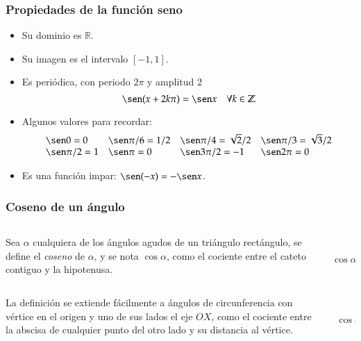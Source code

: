 \begin{frame}
\frametitle{Propiedades de la función seno}
\begin{itemize}
\item Su dominio es $\mathbb{R}$.
\item Su imagen es el intervalo $[-1,1]$.
\item Es periódica, con periodo $2\pi$ y amplitud $2$
\[\sen (x+2k\pi)= \sen x\quad \forall k\in \mathbb{Z}\]
\item Algunos valores para recordar:
\[
\begin{array}{llll}
\sen 0=0 & \sen \pi/6= 1/2 & \sen \pi/4=\sqrt{2}/2 & \sen \pi/3= \sqrt{3}/2\\
\sen \pi/2 =1 & \sen \pi = 0 & \sen 3\pi/2=-1 & \sen 2\pi=0
\end{array}
\]
\item Es una función impar: $\sen(-x)=-\sen x$.
\end{itemize}
\end{frame} 


\begin{frame}
\frametitle{Coseno de un ángulo}
\begin{definicion}
\begin{columns}
\begin{column}{0.6\textwidth}
Sea $\alpha$ cualquiera de los ángulos agudos de un triángulo rectángulo, se define el \emph{coseno} de $\alpha$, y se nota $\cos \alpha$, como el cociente entre el cateto contiguo y la hipotenusa.
\end{column}
\begin{column}{0.2\textwidth}
\begin{center}
\scalebox{1}{}\\
\scriptsize 
$\cos \alpha= \dfrac{AB}{AC}$
\end{center}
\end{column}
\end{columns}
\end{definicion}
\bigskip
\begin{columns}
\begin{column}{0.6\textwidth}
La definición se extiende fácilmente a ángulos de circunferencia con vértice en el origen y uno de sus lados el eje $OX$, como el cociente entre la abscisa de cualquier punto del otro lado y su distancia al vértice.
\end{column}
\begin{column}{0.2\textwidth}
\begin{center}
\scalebox{1}{}\\
\scriptsize
$\cos \alpha= \dfrac{AB}{AC}$
\end{center}
\end{column}
\end{columns}
\end{frame} 


